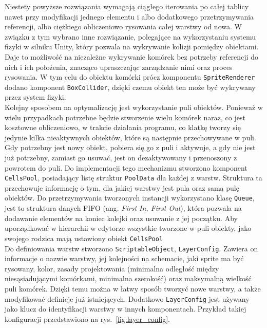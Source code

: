 Niestety powyższe rozwiązania wymagają ciągłego iterowania po całej tablicy nawet przy modyfikacji jednego elementu
i albo dodatkowego przetrzymywania referencji, albo ciężkiego obliczeniowo rysowania całej warstwy od nowa.
W związku z tym wybrano inne rozwiązanie, polegające na wykorzystaniu systemu fizyki w silniku Unity,
który pozwala na wykrywanie kolizji pomiędzy obiektami.
Daje to możliwość na niezależne wykrywanie komórek bez potrzeby referencji do nich i ich położenia,
znacząco upraszczając zarządzanie nimi oraz proces rysowania.
W tym celu do obiektu komórki prócz komponentu \texttt{SpriteRenderer} dodano komponent \texttt{BoxCollider},
dzięki czemu obiekt ten może być wykrywany przez system fizyki.\\
\indent Kolejny sposobem na optymalizację jest wykorzystanie puli obiektów.
Ponieważ w wielu przypadkach potrzebne będzie stworzenie wielu komórek naraz, co jest kosztowne obliczeniowo,
w trakcie działania programu, co klatkę tworzy się jedynie kilka nieaktywnych obiektów, które są następnie przechowywane w puli.
Gdy potrzebny jest nowy obiekt, pobiera się go z puli i aktywuje, a gdy nie jest już potrzebny,
zamiast go usuwać, jest on dezaktywowany i przenoszony z powrotem do puli.
Do implementacji tego mechanizmu stworzono komponent \texttt{CellsPool},
posiadający listę struktur \texttt{PoolData} dla każdej z warstw.
Struktura ta przechowuje informację o tym, dla jakiej warstwy jest pula oraz samą pulę obiektów.
Do przetrzymywania tworzonych instancji wykorzystano klasę \texttt{Queue},
jest to struktura danych FIFO (ang. \textit{First In, First Out}),
która pozwala na dodawanie elementów na koniec kolejki oraz usuwanie z jej początku.
Aby uporządkować w hierarchii w edytorze wszystkie tworzone w puli obiekty,
jako swojego rodzica mają ustawiony obiekt \texttt{CellsPool}\\
\indent Do definiowania warstw stworzono \texttt{ScriptableObject}, \texttt{LayerConfig}.
Zawiera on informacje o nazwie warstwy, jej kolejności na schemacie, jaki sprite ma być rysowany, kolor,
zasady projektowania (minimalna odległość między niesąsiadującymi komórkami, minimalna szerokość)
oraz maksymalną wielkość puli komórek.
Dzięki temu można w łatwy sposób tworzyć nowe warstwy, a także modyfikować definicje już istniejących.
Dodatkowo \texttt{LayerConfig} jest używany jako klucz do identyfikacji warstwy w innych komponentach.
Przykład takiej konfiguracji przedstawiono na rys.~\ref{fig:layer_config}.

